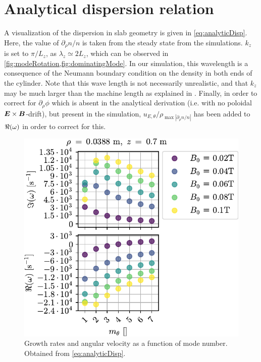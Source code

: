 \section{Analytical dispersion relation}
\label{sec:analDisp}
%
A visualization of the dispersion in slab geometry is given in \cref{eq:analyticDisp}.
Here, the value of $\partial_\rho n/n$ is taken from the steady state from the simulations.
$k_z$ is set to $\pi/L_z$, as  $\lambda_z \simeq 2L_z$, which can be observed in \cref{fig:modeRotation,fig:dominatingMode}.
In our simulation, this wavelength is a consequence of the Neumann boundary condition on the density in both ends of the cylinder.
Note that this wave length is not necessarily unrealistic, and that $k_z$ may be much larger than the machine length as explained in \cite{Chen1965}.
Finally, in order to correct for $\partial_\rho\phi$ which is absent in the analytical derivation (i.e. with no poloidal $\boldsymbol{E}\times\boldsymbol{B}$-drift), but present in the simulation, $u_{E,\theta}/\rho_{\max|\partial_\rho n/n|}$ has been added to $\Re(\omega)$ in order to correct for this.
%
\begin{figure}[htb]
    \centering
    \includegraphics{fig/results/growthRates/growthRatesAnalyticB0}
    \caption{Growth rates and angular velocity as a function of mode number.
        Obtained from \cref{eq:analyticDisp}.}
    \label{fig:grAnalytic}
\end{figure}
%

